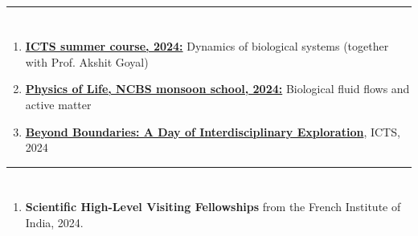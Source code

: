 \documentclass[10pt]{res} %
\begin{document}
\begin{resume}
\vspace*{-2mm}

\noindent\rule{\textwidth}{0.6pt}
\vspace*{-10mm}
\section{}
\vspace*{6mm}
\begin{enumerate}
	\item \href{https://www.icts.res.in/lectures/sc-2024}{\textbf{ICTS summer course, 2024:}} Dynamics of biological systems (together with Prof. Akshit Goyal)
	
	\item \href{https://www.ncbs.res.in/events/physics-of-life-2024-9th-annual-monsoon-school}{\textbf{Physics of Life, NCBS monsoon school, 2024:}} Biological fluid flows and active matter
	
	\item \href{https://www.icts.res.in/outreach/other-events/BB2024}{\textbf{Beyond Boundaries: A Day of Interdisciplinary Exploration}}, ICTS, 2024
\end{enumerate}



\vspace*{-2mm}
\noindent\rule{\textwidth}{0.6pt}
\vspace*{-10mm}
\section{}
\vspace*{6mm}
\begin{enumerate}
	\item \textbf{Scientific High-Level Visiting Fellowships} from the French Institute of India, 2024.
	

\end{enumerate}
\end{resume}
\end{document}

